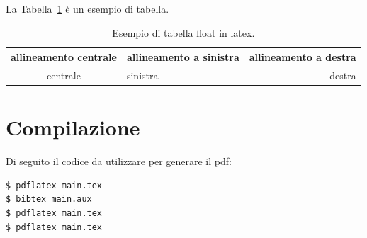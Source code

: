 La Tabella~\ref{tab:esempio} è un esempio di tabella.

\begin{table}[htb]
    \centering
    \begin{tabular}{| c | l | r |}
        \hline
        allineamento centrale & allineamento a sinistra  & allineamento a destra
        \\
        \hline
        \hline
        centrale & sinistra & destra
        \\
        \hline
    \end{tabular}
    \caption{Esempio di tabella float in latex.}
\label{tab:esempio}
\end{table}

\section{Compilazione}
\label{compilazione}

Di seguito il codice da utilizzare per generare il pdf:
\begin{lstlisting}[language=bash]
$ pdflatex main.tex
$ bibtex main.aux
$ pdflatex main.tex
$ pdflatex main.tex
\end{lstlisting}

